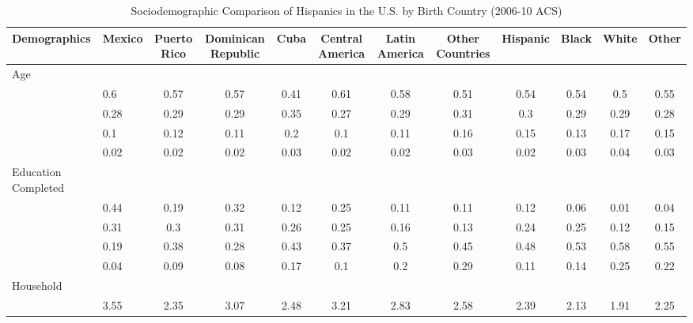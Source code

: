 \begin{table}[ht]
\centering
\caption{Sociodemographic Comparison of Hispanics in the U.S. by Birth Country (2006-10 ACS)} 
\begingroup\small
\begin{tabular}{>{\raggedright\arraybackslash}p{3.2cm}|lcccccc|cccc}
  \hline
Demographics & Mexico & Puerto Rico & Dominican Republic & Cuba & Central America & Latin America & Other Countries & Hispanic & Black & White & Other \\ 
  \hline
Age &  &  &  &  &  &  &  &  &  &  &  \\ 
  \multicolumn{1}{>{\raggedleft\arraybackslash}p{1.5cm}|}{\makebox[1.5cm][r]{60 - 69 }}& 0.6 & 0.57 & 0.57 & 0.41 & 0.61 & 0.58 & 0.51 & 0.54 & 0.54 & 0.5 & 0.55 \\ 
  \multicolumn{1}{>{\raggedleft\arraybackslash}p{1.5cm}|}{\makebox[1.5cm][r]{70 - 79 }}& 0.28 & 0.29 & 0.29 & 0.35 & 0.27 & 0.29 & 0.31 & 0.3 & 0.29 & 0.29 & 0.28 \\ 
  \multicolumn{1}{>{\raggedleft\arraybackslash}p{1.5cm}|}{\makebox[1.5cm][r]{80 - 89 }}& 0.1 & 0.12 & 0.11 & 0.2 & 0.1 & 0.11 & 0.16 & 0.15 & 0.13 & 0.17 & 0.15 \\ 
  \multicolumn{1}{>{\raggedleft\arraybackslash}p{1.5cm}|}{\makebox[1.5cm][r]{90 plus }}& 0.02 & 0.02 & 0.02 & 0.03 & 0.02 & 0.02 & 0.03 & 0.02 & 0.03 & 0.04 & 0.03 \\ 
  Education Completed &  &  &  &  &  &  &  &  &  &  &  \\ 
  \multicolumn{1}{>{\raggedleft\arraybackslash}p{3.2cm}|}{\makebox[3.2cm][r]{Less than Primary }}& 0.44 & 0.19 & 0.32 & 0.12 & 0.25 & 0.11 & 0.11 & 0.12 & 0.06 & 0.01 & 0.04 \\ 
  \multicolumn{1}{>{\raggedleft\arraybackslash}p{1.7cm}|}{\makebox[1.7cm][r]{Primary }}& 0.31 & 0.3 & 0.31 & 0.26 & 0.25 & 0.16 & 0.13 & 0.24 & 0.25 & 0.12 & 0.15 \\ 
  \multicolumn{1}{>{\raggedleft\arraybackslash}p{2cm}|}{\makebox[2cm][r]{Secondary }}& 0.19 & 0.38 & 0.28 & 0.43 & 0.37 & 0.5 & 0.45 & 0.48 & 0.53 & 0.58 & 0.55 \\ 
  \multicolumn{1}{>{\raggedleft\arraybackslash}p{2cm}|}{\makebox[2cm][r]{University }}& 0.04 & 0.09 & 0.08 & 0.17 & 0.1 & 0.2 & 0.29 & 0.11 & 0.14 & 0.25 & 0.22 \\ 
  Household &  &  &  &  &  &  &  &  &  &  &  \\ 
  \multicolumn{1}{>{\raggedleft\arraybackslash}p{2.7cm}|}{\makebox[2.7cm][r]{Household Size }}& 3.55 & 2.35 & 3.07 & 2.48 & 3.21 & 2.83 & 2.58 & 2.39 & 2.13 & 1.91 & 2.25 \\ 

\end{tabular}
\end{table}
